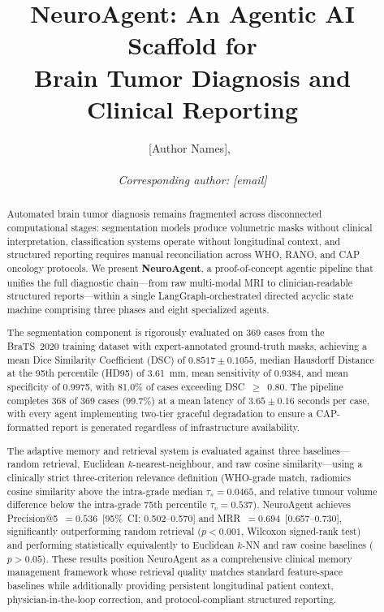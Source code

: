 \documentclass[journal]{IEEEtran}
\begin{document}
\title{NeuroAgent: An Agentic AI Scaffold for\\
Brain Tumor Diagnosis and Clinical Reporting}

\author{[Author Names],~\\
[Affiliation]\\
\textit{Corresponding author: [email]}}

\maketitle

\begin{abstract}
Automated brain tumor diagnosis remains fragmented across disconnected
computational stages: segmentation models produce volumetric masks without
clinical interpretation, classification systems operate without longitudinal
context, and structured reporting requires manual reconciliation across WHO,
RANO, and CAP oncology protocols. We present \textbf{NeuroAgent}, a
proof-of-concept agentic pipeline that unifies the full diagnostic
chain---from raw multi-modal MRI to clinician-readable structured
reports---within a single LangGraph-orchestrated directed acyclic state
machine comprising three phases and eight specialized agents.

The segmentation component is rigorously evaluated on 369 cases from the
BraTS~2020 training dataset with expert-annotated ground-truth masks,
achieving a mean Dice Similarity Coefficient (DSC) of $0.8517 \pm 0.1055$,
median Hausdorff Distance at the 95th percentile (HD95) of 3.61~mm, mean
sensitivity of 0.9384, and mean specificity of 0.9975, with 81.0\% of
cases exceeding DSC~$\geq$~0.80. The pipeline completes 368 of 369 cases
(99.7\%) at a mean latency of $3.65 \pm 0.16$ seconds per case, with every
agent implementing two-tier graceful degradation to ensure a CAP-formatted
report is generated regardless of infrastructure availability.

The adaptive memory and retrieval system is evaluated against three
baselines---random retrieval, Euclidean $k$-nearest-neighbour, and raw
cosine similarity---using a clinically strict three-criterion relevance
definition (WHO-grade match, radiomics cosine similarity above the
intra-grade median $\tau_s = 0.0465$, and relative tumour volume
difference below the intra-grade 75th percentile $\tau_v = 0.537$).
NeuroAgent achieves Precision@5~$= 0.536$~[95\%~CI: 0.502--0.570] and
MRR~$= 0.694$~[0.657--0.730], significantly outperforming random
retrieval ($p < 0.001$, Wilcoxon signed-rank test) and performing
statistically equivalently to Euclidean $k$-NN and raw cosine baselines
($p > 0.05$). These results position NeuroAgent as a comprehensive
clinical memory management framework whose retrieval quality matches
standard feature-space baselines while additionally providing persistent
longitudinal patient context, physician-in-the-loop correction, and
protocol-compliant structured reporting.


\end{abstract}
\end{document}
